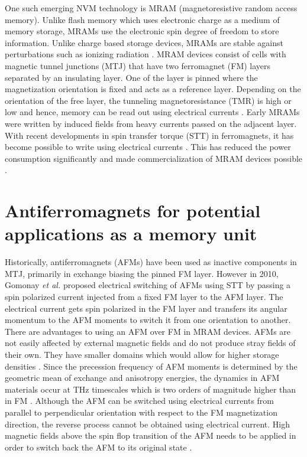 \documentclass[10pt,doublespacing,edeposit]{uiucthesis2020}
\begin{document}
\begin{mainmatter}
One such emerging NVM technology is MRAM (magnetoresistive random access memory). Unlike flash memory which uses electronic charge as a medium of memory storage, MRAMs use the electronic spin degree of freedom to store information. Unlike charge based storage devices, MRAMs are stable against perturbations such as ionizing radiation \cite{Wadley2016}. MRAM devices consist of cells with magnetic tunnel junctions (MTJ) that have two ferromagnet (FM) layers separated by an insulating layer. One of the layer is pinned where the magnetization orientation is fixed and acts as a reference layer. Depending on the orientation of the free layer, the tunneling magnetoresistance (TMR) is high or low and hence, memory can be read out using electrical currents \cite{Krishnan2016}. Early MRAMs were written by induced fields from heavy currents passed on the adjacent layer. With recent developments in spin transfer torque (STT) in ferromagnets, it has become possible to write using electrical currents \cite{Chappert2007}. This has reduced the power consumption significantly and made commercialization of MRAM devices possible \cite{Krishnan2016,Bhatti2017}.

\section{Antiferromagnets for potential applications as a memory unit}

Historically, antiferromagnets (AFMs) have been used as inactive components in MTJ, primarily in exchange biasing the pinned FM layer. However in 2010, Gomonay \emph{et al.} \cite{Gomonay2010} proposed electrical switching of AFMs using STT by passing a spin polarized current injected from a fixed FM layer to the AFM layer. The electrical current gets spin polarized in the FM layer and transfers its angular momentum to the AFM moments to switch it from one orientation to another. There are advantages to using an AFM over FM in MRAM devices. AFMs are not easily affected by external magnetic fields and do not produce stray fields of their own. They have smaller domains which would allow for higher storage densities \cite{Wadley2016}. Since the precession frequency of AFM moments is determined by the geometric mean of exchange and anisotropy energies, the dynamics in AFM materials occur at THz timescales which is two orders of magnitude higher than in FM \cite{Siddiqui2020}. Although the AFM can be switched using electrical currents from parallel to perpendicular orientation with respect to the FM magnetization direction, the reverse process cannot be obtained using electrical current. High magnetic fields above the spin flop transition of the AFM needs to be applied in order to switch back the AFM to its original state \cite{Gomonay2010}.


\end{mainmatter}
\end{document}
